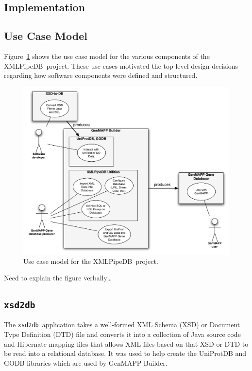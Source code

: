 \documentclass[10pt]{bmc_article}
\newenvironment{bmcformat}{\begin{raggedright}\baselineskip20pt\sloppy\setboolean{publ}{false}}{\end{raggedright}\baselineskip20pt\sloppy}
\def\xmlpipedb{XMLPipeDB}                       %
\def\xsd2db{\texttt{xsd2db}}
\begin{document}
\begin{bmcformat}
\section*{Implementation}

\subsection*{Use Case Model}

Figure~\ref{usecase} shows the use case model for the various components of the \xmlpipedb\ project.  These use cases motivated the top-level design decisions regarding how software components were defined and structured.\pb

\begin{figure}[htbp] %
   \centering
   \includegraphics[width=5.5in]{figures/use-cases.pdf} 
   \caption{Use case model for the \xmlpipedb\ project.}
   \label{usecase}
\end{figure}

Need to explain the figure verbally\ldots\pb

\subsection*{\xsd2db}

The \xsd2db\ application takes a well-formed XML Schema (XSD) or Document Type Definition (DTD) file and converts it into a collection of Java source code and Hibernate mapping files that allows XML files based on that XSD or DTD to be read into a relational database.  It was used to help create the UniProtDB and GODB libraries which are used by GenMAPP Builder.\pb


\end{bmcformat}
\end{document}
